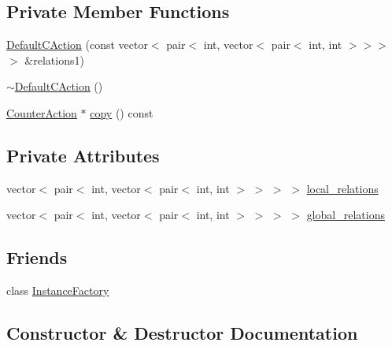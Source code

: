 \subsection*{Private Member Functions}
\begin{DoxyCompactItemize}
\item 
\mbox{\hyperlink{classgraphsat_1_1_default_c_action_a12283e84a4da37280c1c8ac56a3564ec}{Default\+C\+Action}} (const vector$<$ pair$<$ int, vector$<$ pair$<$ int, int $>$$>$$>$$>$ \&relations1)
\item 
\mbox{\hyperlink{classgraphsat_1_1_default_c_action_a05af49386f59671eebee3b120dc0a086}{$\sim$\+Default\+C\+Action}} ()
\item 
\mbox{\hyperlink{classgraphsat_1_1_counter_action}{Counter\+Action}} $\ast$ \mbox{\hyperlink{classgraphsat_1_1_default_c_action_a69fa305cacc678c4435bad7a101302aa}{copy}} () const
\end{DoxyCompactItemize}
\subsection*{Private Attributes}
\begin{DoxyCompactItemize}
\item 
vector$<$ pair$<$ int, vector$<$ pair$<$ int, int $>$ $>$ $>$ $>$ \mbox{\hyperlink{classgraphsat_1_1_default_c_action_afa01fc648aa9cb9713c9bb01ca5d5ce2}{local\+\_\+relations}}
\item 
vector$<$ pair$<$ int, vector$<$ pair$<$ int, int $>$ $>$ $>$ $>$ \mbox{\hyperlink{classgraphsat_1_1_default_c_action_aac5f877175ded69616afb1ff2812562b}{global\+\_\+relations}}
\end{DoxyCompactItemize}
\subsection*{Friends}
\begin{DoxyCompactItemize}
\item 
class \mbox{\hyperlink{classgraphsat_1_1_default_c_action_ad4b3c25c041701ae56dc1e78df779d2f}{Instance\+Factory}}
\end{DoxyCompactItemize}


\subsection{Constructor \& Destructor Documentation}
\mbox{\label{classgraphsat_1_1_default_c_action_a12283e84a4da37280c1c8ac56a3564ec}} 
